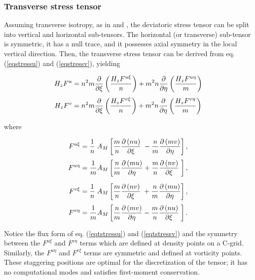\subsubsection{Transverse stress tensor}

Assuming transverse isotropy, as in
\cite{Sadourny_97} and \cite{Griffies_2000},
the deviatoric stress tensor can be split into vertical and horizontal
sub-tensors.  The horizontal (or transverse) sub-tensor is symmetric, it
has a null trace, and it possesses axial symmetry in the local vertical
direction.  Then, the transverse stress tensor can be derived from eq.
(\ref{eqstressu}) and (\ref{eqstressv}), yielding

\begin{align}
      H_{z}F^{u} &= {n^2}m
{\partial\over\partial\xi}\left(\frac{H_{z}F^{u\xi}}{n}\right) +
                {m^2}n
{\partial\over\partial\eta}\left(\frac{H_{z}F^{u\eta}}{m}\right)
\label{eqtstressu} \\
   \noalign{\smallskip}
      H_{z}F^{v} &= {n^2}m
{\partial\over\partial\xi}\left(\frac{H_{z}F^{v\xi}}{n}\right) +
                {m^2}n
{\partial\over\partial\eta}\left(\frac{H_{z}F^{v\eta}}{m}\right)
\label{eqtstressv} 
\end{align}

where

\begin{align}
         F^{u\xi} &= \frac{1}{n} \;A_{M}\left[
               \frac{m}{n} {\pder{\left( nu \right) }{\xi}} \;-
               \frac{n}{m} {\pder{\left( mv \right) }{\eta}}
\right], \\
      \noalign{\smallskip}
         F^{u\eta} &= \frac{1}{m} A_{M}\left[
               \frac{n}{m} {\pder{\left( mu \right) }{\eta}} +
               \frac{m}{n} {\pder{\left( nv \right) }{\xi}}
\;\right], \\
      \noalign{\medskip}
         F^{v\xi} &= \frac{1}{n} \;A_{M}\left[
               \frac{m}{n} {\pder{\left( nv \right) }{\xi}} \;+
               \frac{n}{m} {\pder{\left( mu \right) }{\eta}}
\right], \\
      \noalign{\smallskip}
         F^{v\eta} &= \frac{1}{m} A_{M}\left[
               \frac{n}{m} {\pder{\left( mv \right) }{\eta}} -
               \frac{m}{n} {\pder{\left( nu \right) }{\xi}}
\;\right].
\end{align}

Notice the flux form of eq. (\ref{eqtstressu}) and (\ref{eqtstressv})
and the symmetry between the $F^{u\xi}$ and $F^{v\eta}$ terms which are
defined at density points on a C-grid. Similarly, the $F^{u\eta}$ and
$F^{v\xi}$ terms are symmetric and defined at vorticity points.  These
staggering positions are optimal for the discretization of the tensor;
it has no computational modes and satisfies first-moment conservation.

